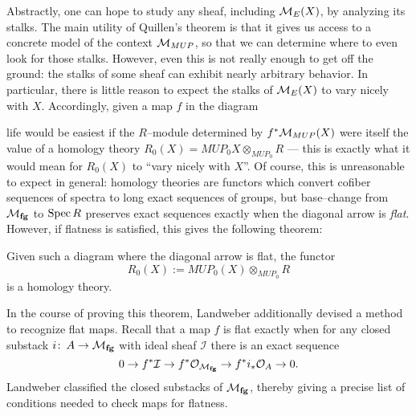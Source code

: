 Abstractly, one can hope to study any sheaf, including $\mathcal{M}_{E}(X)$, by analyzing its stalks.  The main utility of Quillen's theorem is that it gives us access to a concrete model of the context $\mathcal{M}_{MUP}$, so that we can determine where to even look for those stalks.  However, even this is not really enough to get off the ground: the stalks of some sheaf can exhibit nearly arbitrary behavior.  In particular, there is little reason to expect the stalks of $\mathcal{M}_{E}(X)$ to vary nicely with $X$.  Accordingly, given a map $f$ in the diagram
\begin{center}
\end{center}
life would be easiest if the $R$--module determined by $f^* \mathcal{M}_{MUP}(X)$ were itself the value of a homology theory $R_0(X) = MUP_0 X \otimes_{MUP_0} R$ --- this is exactly what it would mean for $R_0(X)$ to ``vary nicely with $X$''.  Of course, this is unreasonable to expect in general: homology theories are functors which convert cofiber sequences of spectra to long exact sequences of groups, but base--change from $\mathcal{M}_{\mathbf{fg}}$ to $\operatorname{Spec} R$ preserves exact sequences exactly when the diagonal arrow is \textit{flat}.  However, if flatness is satisfied, this gives the following theorem:

\begin{theorem}[Landweber]\label{LandwebersStackyTheorem}
Given such a diagram where the diagonal arrow is flat, the functor \[R_0(X) := MUP_0(X) \otimes_{MUP_0} R\] is a homology theory.
\end{theorem}

\noindent In the course of proving this theorem, Landweber additionally devised a method to recognize flat maps.  Recall that a map $f$ is flat exactly when for any closed substack $i\colon\thinspace A \to \mathcal{M}_{\mathbf{fg}}$ with ideal sheaf $\mathcal I$ there is an exact sequence \[0 \to f^* \mathcal I \to f^* \mathcal O_{\mathcal{M}_{\mathbf{fg}}} \to f^* i_* \mathcal O_A \to 0.\]  Landweber classified the closed substacks of $\mathcal{M}_{\mathbf{fg}}$, thereby giving a precise list of conditions needed to check maps for flatness.

